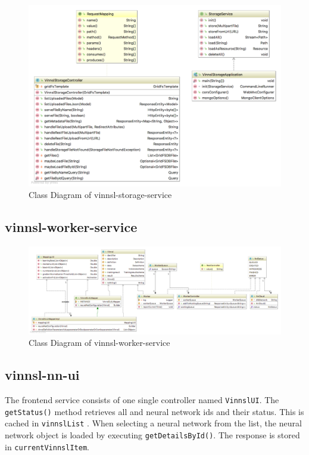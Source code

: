 \begin{figure}
\centering
\includegraphics[width=15.00000cm]{images/uml-class-diagram-vinnsl-storage-service}
\caption{Class Diagram of vinnsl-storage-service}
\end{figure}

\subsection{vinnsl-worker-service}\label{vinnsl-worker-service}

\begin{figure}
\centering
\includegraphics[width=17.00000cm]{images/uml-class-diagram-vinnsl-worker-service}
\caption{Class Diagram of vinnsl-worker-service}
\end{figure}

\subsection{vinnsl-nn-ui}\label{vinnsl-nn-ui}

The frontend service consists of one single controller named
\texttt{VinnslUI}. The \texttt{getStatus()} method retrieves all and
neural network ids and their status. This is cached in
\texttt{vinnslList} . When selecting a neural network from the list, the
neural network object is loaded by executing \texttt{getDetailsById()}.
The response is stored in \texttt{currentVinnslItem}.

